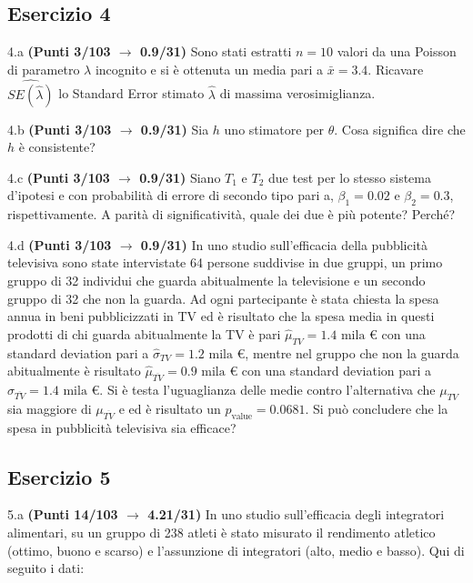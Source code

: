 \documentclass[
  11pt,
]{book}
\theoremstyle{mytheoremstyle}
\theoremstyle{mydefstyle}
\begin{document}
\subsection{Esercizio 4}\label{esercizio-4-26}

4.a \textbf{(Punti 3/103 \(\rightarrow\) 0.9/31)} Sono stati estratti \(n=10\) valori da una Poisson di parametro \(\lambda\) incognito e si è ottenuta un media pari a \(\bar x=3.4\). Ricavare \(\widehat{SE(\hat\lambda)}\) lo Standard Error stimato \(\hat\lambda\) di massima verosimiglianza.

4.b \textbf{(Punti 3/103 \(\rightarrow\) 0.9/31)} Sia \(h\) uno stimatore per \(\theta\). Cosa significa dire che \(h\) è consistente?

4.c \textbf{(Punti 3/103 \(\rightarrow\) 0.9/31)} Siano \(T_1\) e \(T_2\) due test per lo stesso sistema d'ipotesi e con probabilità di errore di secondo tipo pari a, \(\beta_1=0.02\) e \(\beta_2=0.3\), rispettivamente. A parità di significatività, quale dei due è più potente? Perché?

4.d \textbf{(Punti 3/103 \(\rightarrow\) 0.9/31)} In uno studio sull'efficacia della pubblicità televisiva sono state intervistate 64 persone suddivise in due gruppi, un primo gruppo di 32 individui che guarda abitualmente la televisione e un secondo gruppo di 32 che non la guarda. Ad ogni partecipante è stata chiesta la spesa annua in beni pubblicizzati in TV ed è risultato che la spesa media in questi prodotti di chi guarda abitualmente la TV è pari \(\hat\mu_{TV}=1.4\text{ mila €}\) con una standard deviation pari a \(\hat\sigma_{TV}=1.2\text{ mila €}\), mentre nel gruppo che non la guarda abitualmente è risultato \(\hat\mu_{\overline{TV}}=0.9\text{ mila €}\) con una standard deviation pari a \(\hat\sigma_{\overline{TV}}=1.4\text{ mila €}\). Si è testa l'uguaglianza delle medie contro l'alternativa che \(\mu_{TV}\) sia maggiore di \(\mu_{\overline{TV}}\) e ed è risultato un \(p_\text{value}= 0.0681\). Si può concludere che la spesa in pubblicità televisiva sia efficace?

\subsection{Esercizio 5}\label{esercizio-5-24}

5.a \textbf{(Punti 14/103 \(\rightarrow\) 4.21/31)} In uno studio sull'efficacia degli integratori alimentari, su un gruppo di 238 atleti è stato misurato il rendimento atletico (ottimo, buono e scarso) e l'assunzione di integratori (alto, medio e basso). Qui di seguito i dati:
\end{document}
